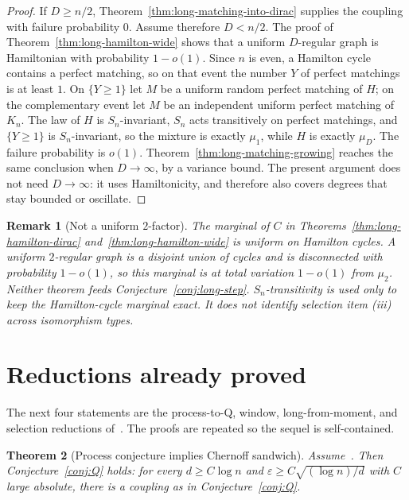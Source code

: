 \documentclass[11pt]{article}
\newtheorem{theorem}{Theorem}
\newtheorem{remark}[theorem]{Remark}
\begin{document}
\begin{proof}
If \(D\ge n/2\), Theorem~\ref{thm:long-matching-into-dirac} supplies the coupling
with failure probability \(0\). Assume therefore \(D<n/2\).
The proof of Theorem~\ref{thm:long-hamilton-wide} shows that a uniform
\(D\)-regular graph is Hamiltonian with probability \(1-o(1)\).
Since \(n\) is even, a Hamilton cycle contains a perfect matching, so on that
event the number \(Y\) of perfect matchings is at least \(1\).
On \(\{Y\ge 1\}\) let \(M\) be a uniform random perfect matching of \(H\); on the
complementary event let \(M\) be an independent uniform perfect matching of \(K_n\).
The law of \(H\) is \(S_n\)-invariant, \(S_n\) acts transitively on perfect matchings,
and \(\{Y\ge 1\}\) is \(S_n\)-invariant, so the mixture is exactly \(\mu_1\), while
\(H\) is exactly \(\mu_D\). The failure probability is \(o(1)\).
Theorem~\ref{thm:long-matching-growing} reaches the same conclusion when
\(D\to\infty\), by a variance bound. The present argument does not need
\(D\to\infty\): it uses Hamiltonicity, and therefore also covers degrees that
stay bounded or oscillate.
\end{proof}

\begin{remark}[Not a uniform \(2\)-factor]
\label{rem:hamilton-not-mu2}
The marginal of \(C\) in Theorems~\ref{thm:long-hamilton-dirac}
and~\ref{thm:long-hamilton-wide} is uniform on Hamilton cycles.
A uniform \(2\)-regular graph is a disjoint union of cycles and is
disconnected with probability \(1-o(1)\), so this marginal is at total variation
\(1-o(1)\) from \(\mu_2\). Neither theorem feeds Conjecture~\ref{conj:long-step}.
\(S_n\)-transitivity is used only to keep the Hamilton-cycle marginal exact.
It does not identify selection item (iii) across isomorphism types.
\end{remark}

\section{Reductions already proved}

The next four statements are the process-to-Q, window, long-from-moment, and
selection reductions of~\cite{PlusOneV1}.
The proofs are repeated so the sequel is self-contained.

\begin{theorem}[Process conjecture implies Chernoff sandwich]
\label{thm:process-to-Q}
Assume~\cite[Conjecture~1.3]{BIM25}.
Then Conjecture~\ref{conj:Q} holds: for every \(d\ge C\log n\) and
\(\varepsilon\ge C\sqrt{(\log n)/d}\) with \(C\) large absolute, there is a coupling
as in Conjecture~\ref{conj:Q}.
\end{theorem}
\end{document}
